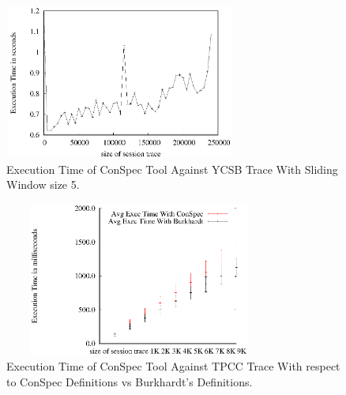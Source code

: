 \documentclass[journal,compsoc]{IEEEtran}
\begin{document}
\begin{figure}%
        \includegraphics[width=3in,height=2in]
                    {conspecExecutionTimes.eps} %
        \caption{Execution Time of ConSpec Tool Against YCSB Trace With Sliding Window size 5.}
        \label{fig:exampleIter}
\end{figure}
     \begin{figure}%
        \includegraphics[width=3.5in,height=2in]
                    {conspecTPCCvarhist.eps} %
        \caption{Execution Time of ConSpec Tool Against TPCC Trace With respect to ConSpec Definitions vs Burkhardt's Definitions.}
        \label{fig:examplefulltpcc}
\end{figure}
\end{document}

